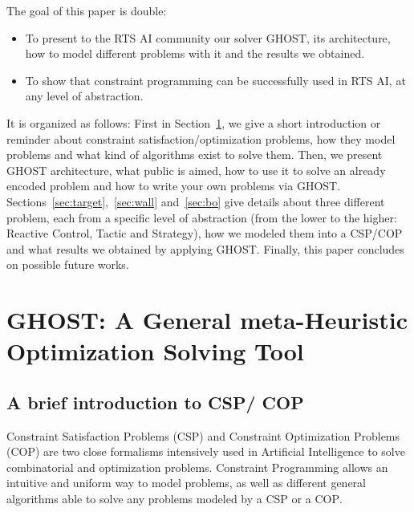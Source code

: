 \documentclass[journal]{IEEEtran}
\newcommand{\csp}{\textsc{CSP}\xspace}
\newcommand{\cop}{\textsc{COP}\xspace}
\newcommand{\ghost}{\textsc{GHOST}\xspace}
\begin{document}
The goal of this paper is double:
\begin{itemize}
\item  To present  to  the RTS  AI community  our  solver \ghost,  its
  architecture,  how  to model  different  problems  with it  and  the
  results we obtained.
\item To show that constraint  programming can be successfully used in
  RTS AI, at any level of abstraction.
\end{itemize}

It is organized as follows:  First in Section~\ref{sec:ghost}, we give
a     short    introduction     or    reminder     about    constraint
satisfaction/optimization problems,  how they model problems  and what
kind  of algorithms  exist to  solve  them.  Then,  we present  \ghost
architecture, what public is aimed, how  to use it to solve an already
encoded   problem   and  how   to   write   your  own   problems   via
\ghost.   Sections~\ref{sec:target},~\ref{sec:wall}   and~\ref{sec:bo}
give details about three different problem, each from a specific level
of abstraction (from the lower to the higher: Reactive Control, Tactic
and Strategy), how  we modeled them into a \csp/\cop  and what results
we  obtained by  applying  \ghost. Finally,  this  paper concludes  on
possible future works.

\section{\ghost:   A  General   meta-Heuristic  Optimization   Solving
  Tool}\label{sec:ghost}
\subsection{A brief introduction to \csp / \cop}

Constraint  Satisfaction Problems  (\csp) and  Constraint Optimization
Problems  (\cop)   are  two  close  formalisms   intensively  used  in
Artificial  Intelligence  to   solve  combinatorial  and  optimization
problems. Constraint  Programming allows an intuitive  and uniform way
to model  problems, as  well as different  general algorithms  able to
solve any problems modeled by a \csp or a \cop.
\end{document}
